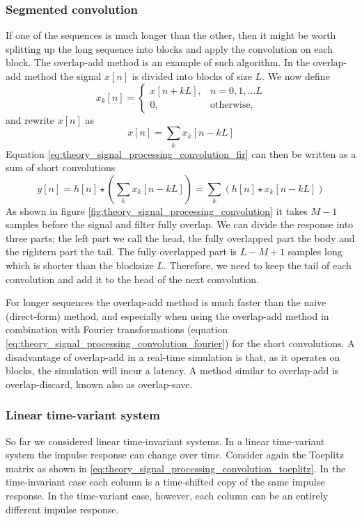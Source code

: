\subsubsection{Segmented convolution}
If one of the sequences is much longer than the other, then it might be worth
splitting up the long sequence into blocks and apply the convolution on each
block. The overlap-add method is an example of such algorithm. In the
overlap-add method the signal $x[n]$ is divided into blocks of size $L$. We now
define
\begin{equation}
 x_k[n] =
 \begin{cases}
  x[n+kL], & n = 0,1,\dots L \\
  0, & \text{otherwise,}
 \end{cases}
\end{equation}
and rewrite $x[n]$ as
\begin{equation}
 x[n] = \sum_k x_k[n-kL]
\end{equation}
Equation \eqref{eq:theory_signal_processing_convolution_fir} can then be written as a sum of short convolutions
\begin{equation}
y[n] = h[n] \star \left( \sum_k x_k[n-kL] \right) = \sum_k \left( h[n] \star x_k[n-kL] \right)
\end{equation}
As shown in figure \ref{fig:theory_signal_processing_convolution} it takes $M-1$
samples before the signal and filter fully overlap. We can divide the response
into three parts; the left part we call the head, the fully overlapped part the
body and the rightern part the tail. The fully overlapped part is $L-M+1$
samples long which is shorter than the blocksize $L$. Therefore, we need to keep
the tail of each convolution and add it to the head of the next convolution.

For longer sequences the overlap-add method is much faster than the naive
(direct-form) method, and especially when using the overlap-add method in
combination with Fourier transformations (equation
\eqref{eq:theory_signal_processing_convolution_fourier}) for the short
convolutions. A disadvantage of overlap-add in a real-time simulation is that,
as it operates on blocks, the simulation will incur a latency.
A method similar to overlap-add is overlap-discard, known also as overlap-save.

\subsubsection{Linear time-variant system}
So far we considered linear time-invariant systems. In a linear time-variant
system the impulse response can change over time. Consider again the Toeplitz
matrix as shown in \eqref{eq:theory_signal_processing_convolution_toeplitz}. In
the time-invariant case each column is a time-shifted copy of the same impulse
response. In the time-variant case, however, each column can be an entirely
different impulse response.

